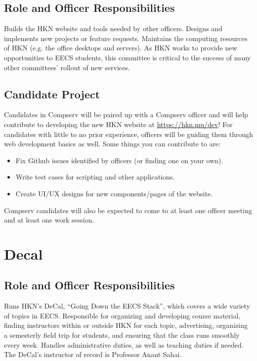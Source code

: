 \documentclass[11pt, article, oneside]{memoir}
\begin{document}
    \subsection{Role and Officer Responsibilities}
        Builds the HKN website and tools needed by other officers.
        Designs and implements new projects or feature requests.
        Maintains the computing resources of HKN (e.g. the office desktops and servers).
        As HKN works to provide new opportunities to EECS students, this committee is critical to the success of many other committees' rollout of new services.

    \subsection{Candidate Project}
        Candidates in Compserv will be paired up with a Compserv officer and will help contribute to developing the new HKN website at \url{https://hkn.mu/dev}!
        For candidates with little to no prior experience, officers will be guiding them through web development basics as well.
        Some things you can contribute to are:
        \begin{itemize}
            \item Fix Github issues identified by officers (or finding one on your own).
            \item Write test cases for scripting and other applications.
            \item Create UI/UX designs for new components/pages of the website.
        \end{itemize} 
        Compserv candidates will also be expected to come to at least one officer meeting and at least one work session.

    \section{Decal}
    \subsection{Role and Officer Responsibilities}
        Runs HKN's DeCal, ``Going Down the EECS Stack'', which covers a wide variety of topics in EECS.
        Responsible for organizing and developing course material, finding instructors within or outside HKN for each topic, advertising, organizing a semesterly field trip for students, and ensuring that the class runs smoothly every week.
        Handles administrative duties, as well as teaching duties if needed.
        The DeCal's instructor of record is Professor Anant Sahai.
\end{document}

